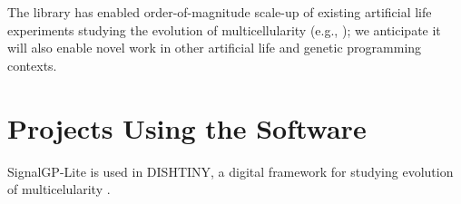 The library has enabled order-of-magnitude scale-up of existing artificial life experiments studying the evolution of multicellularity (e.g., \citep{moreno2021exploring,moreno2021case}); we anticipate it will also enable novel work in other artificial life and genetic programming contexts.

\section{Projects Using the Software}

SignalGP-Lite is used in DISHTINY, a digital framework for studying evolution of multicelularity \citep{moreno2019toward,moreno2021exploring,moreno2021case}.
